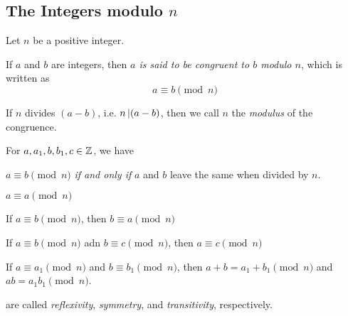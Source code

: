 \subsection{\texorpdfstring{The Integers modulo $n$}{The Integers modulo n}}\label{subsec:Integer_Modulo_n}
Let $n$ be a positive integer.
\begin{definition}[Congruence]\label{def:Congruence}
  If $a$ and $b$ are integers, then \emph{$a$ is said to be congruent to $b$ modulo $n$}, which is written as
  \begin{equation}\label{eq:A_Congruent_B}
    a \equiv b \pmod{n}
  \end{equation}

  If $n$ divides $(a-b)$, i.e. $n \operatorname{\vert} (a-b)$, then we call $n$ the \emph{modulus} of the congruence.

\end{definition}

\begin{theorem}
  For $a, a_{1}, b, b_{1}, c\in \operatorname{\mathbb{Z}}$, we have
  \begin{propertylist}
  \item $a \equiv b \pmod{n}$ \emph{if and only if} $a$ and $b$ leave the same  when divided by $n$.
  \item $a \equiv a \pmod{n}$ \label{prop:A_Congruent_B_Reflexivity}
  \item If $a \equiv b \pmod{n}$, then $b \equiv a \pmod{n}$ \label{prop:A_Congruent_B_Symmetry}
  \item If $a \equiv b \pmod{n}$ adn $b \equiv c \pmod{n}$, then $a \equiv c \pmod{n}$ \label{prop:A_Congruent_B_Transitivity}
  \item If $a \equiv a_{1} \pmod{n}$ and $b \equiv b_{1} \pmod{n}$, then $a+b = a_{1} + b_{1} \pmod{n}$ and $ab = a_{1}b_{1} \pmod{n}$.
  \end{propertylist}

   are called \emph{reflexivity}, \emph{symmetry}, and \emph{transitivity}, respectively.
\end{theorem}

